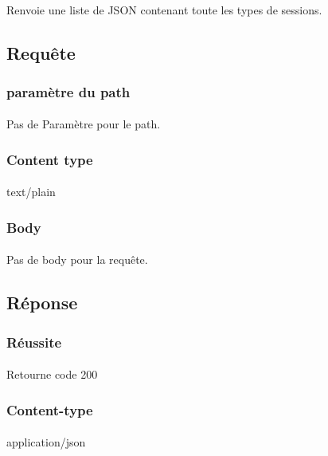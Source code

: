 \paragraph{}
	Renvoie une liste de JSON contenant toute les types de sessions.

\subsection{Requête}
	\subsubsection{paramètre du path}
		\paragraph{}
			Pas de Paramètre pour le path.
	
	\subsubsection{Content type}
		\paragraph{}
			text/plain
			
	\subsubsection{Body}
		\paragraph{}
			Pas de body pour la requête.

\newpage
\subsection{Réponse}
	\subsubsection{Réussite}
		\paragraph{}
			Retourne code 200
			
	\subsubsection{Content-type}
		\paragraph{}
			application/json
	
